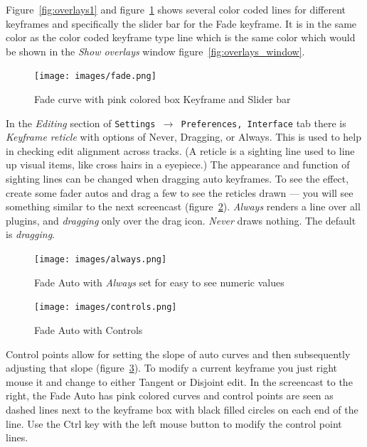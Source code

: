 Figure~\ref{fig:overlays1} and figure~\ref{fig:fade} shows several color coded lines for different key\-fra\-mes and specifically the slider bar for the Fade keyframe.  It is in the same color as the color coded keyframe type line which is the same color which would be shown in the \textit{Show overlays} window figure~\ref{fig:overlays_window}.

\begin{figure}[htpb]
    \centering
    \texttt{[image: images/fade.png]}
    \caption{Fade curve with pink colored box Keyframe and Slider bar}
    \label{fig:fade}
\end{figure}

In the \textit{Editing} section of \texttt{Settings $\rightarrow$ Preferences, Interface} tab there is \textit{Keyframe reticle} with options of Never, Dragging, or Always.  This is used to help in checking edit alignment across tracks.  (A reticle is a sighting line used to line up visual items, like cross hairs in a eyepiece.)  The appearance and function of sighting lines can be changed when dragging auto keyframes.  To see the effect, create some fader autos and drag a few to see the reticles drawn --- you will see something similar to the next screencast (figure~\ref{fig:always}).  \textit{Always} renders a line over all plugins, and \textit{dragging} only over the drag icon. \textit{Never} draws nothing.  The default is \textit{dragging}.

\begin{figure}[htpb]
    \centering
    \texttt{[image: images/always.png]}
    \caption{Fade Auto with \textit{Always} set for easy to see numeric values}
    \label{fig:always}
\end{figure}

\begin{figure}
    \vspace{-2ex}
    \centering
    \texttt{[image: images/controls.png]}
    \caption{Fade Auto with Controls}
    \label{fig:controls}
\end{figure}

Control points allow for setting the slope of auto curves and then
subsequently adjusting that slope (figure~\ref{fig:controls}).  To modify a current keyframe
you just right mouse it and change to either Tangent or Disjoint edit.
In the screencast to the right, the Fade Auto has pink colored curves and control points are seen as dashed lines next to the keyframe box with black filled circles on each end of the line.  Use the Ctrl key with the left mouse button to modify the control point lines.

